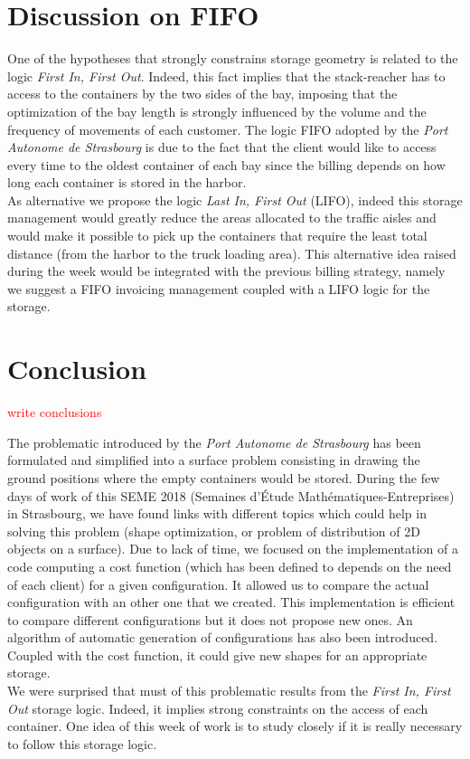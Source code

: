 \documentclass{article}
\newcommand{\ls}[1]{\textcolor{red}{#1}}
\newcommand{\PAS}{\emph{Port Autonome de Strasbourg }}
\begin{document}
\section{Discussion on FIFO}
One of the hypotheses that strongly constrains storage geometry is related to  the logic \textit{First In, First Out}. 
Indeed, this fact implies that the stack-reacher has to access to the containers by the two sides of the bay, imposing that the optimization of the bay length is strongly influenced by the volume and the frequency of movements of each customer. 
The logic FIFO adopted by the \PAS is due to the fact that the client would like to access every time to the oldest container of each bay since the billing depends on how long each container is stored in the harbor. \\
As alternative we propose the logic \textit{Last In, First Out} (LIFO), indeed this storage management would greatly reduce the areas allocated to the traffic aisles and would make it possible to pick up the containers that require the least total distance (from the harbor to the truck loading area). 
This alternative idea raised during the week would be integrated with the previous billing strategy, namely we suggest a FIFO invoicing management coupled with a LIFO logic for the storage.


\section{Conclusion}

\ls{write conclusions}

The problematic introduced by the \PAS has been formulated and simplified into a surface problem consisting in drawing the ground positions where the empty containers would be stored. During the few days of work of this SEME 2018 (Semaines d'\'Etude Mathématiques-Entreprises) in Strasbourg, we have found links with different topics which could help in solving this problem (shape optimization, or problem of distribution of 2D objects on a surface). Due to lack of time, we focused on the implementation of a code computing a cost function (which has been defined to depends on the need of each client) for a given configuration. It allowed us to compare the actual configuration with an other one that we created. This implementation is efficient to compare different configurations but it does not propose new ones. An algorithm of automatic generation of configurations has also been introduced. Coupled with the cost function, it could give new shapes for an appropriate storage.\\

We were surprised that must of this problematic results from the \textit{First In, First Out} storage logic. Indeed, it implies strong constraints on the access of each container. One idea of this week of work is to study closely if it is really necessary to follow this storage logic.




\end{document}
